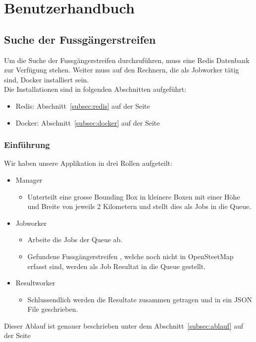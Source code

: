 \section{Benutzerhandbuch}
\subsection{Suche der Fussgängerstreifen}
Um die Suche der Fussgängerstreifen durchzuführen, muss eine Redis Datenbank zur Verfügung stehen. Weiter muss auf den Rechnern, die als Jobworker tätig sind, Docker installiert sein. \\
Die Installationen sind in folgenden Abschnitten aufgeführt:
\begin{itemize}
	\item Redis:  Abschnitt~\ref{subsec:redis} auf der Seite~\pageref{subsec:redis}
	\item Docker: Abschnitt~\ref{subsec:docker} auf der Seite~\pageref{subsec:docker}
\end{itemize}

\subsubsection{Einführung}
Wir haben unsere Applikation in drei Rollen aufgeteilt:
\begin{itemize}
	\item Manager
	\begin{itemize}
		\item Unterteilt eine grosse Bounding Box in kleinere Boxen mit einer Höhe und Breite von jeweils 2 Kilometern und stellt dies als Jobs in die Queue.
	\end{itemize}
	\item Jobworker
	\begin{itemize}
		\item Arbeite die Jobs der Queue ab.
		\item Gefundene Fussgängerstreifen , welche noch nicht in OpenSteetMap erfasst sind, werden als Job Resultat in die Queue gestellt.
	\end{itemize}
	\item Resultworker
	\begin{itemize}
		\item Schlussendlich werden die Resultate zusammen getragen und in ein JSON File geschrieben.
	\end{itemize}
\end{itemize}

Dieser Ablauf ist genauer beschrieben unter dem Abschnitt~\ref{subsec:ablauf} auf der Seite~\pageref{subsec:ablauf}

